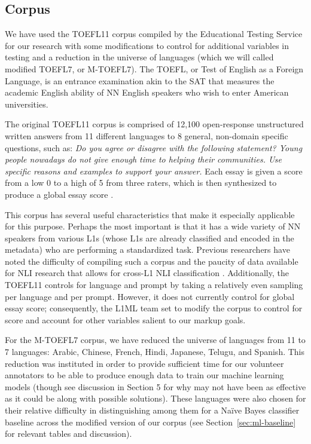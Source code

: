 \documentclass[10pt, a4paper]{article}
\begin{document}
\subsection{Corpus\label{sec:corpus}}
We have used the TOEFL11 corpus compiled by the Educational Testing Service for our research with some modifications to control for additional variables in testing and a reduction in the universe of languages (which we will called modified TOEFL7, or M-TOEFL7). The TOEFL, or Test of English as a Foreign Language, is an entrance examination akin to the SAT that measures the academic English ability of NN English speakers who wish to enter American universities. 

The original TOEFL11 corpus is comprised of 12,100 open-response unstructured written answers from 11 different languages to 8 general, non-domain specific questions, such as: \textit{Do you agree or disagree with the following statement? Young people nowadays do not give enough time to helping their communities. Use specific reasons and examples to support your answer.} Each essay is given a score from a low 0 to a high of 5 from three raters, which is then synthesized to produce a global essay score \cite{toefl11-report}. 

This corpus has several useful characteristics that make it especially applicable for this purpose. Perhaps the most important is that it has a wide variety of NN speakers from various L1s (whose L1s are already classified and encoded in the metadata) who are performing a standardized task. Previous researchers have noted the difficulty of compiling such a corpus and the paucity of data available for NLI research that allows for cross-L1 NLI classification \cite{toefl11-report}. Additionally, the TOEFL11 controls for language and prompt by taking a relatively even sampling per language and per prompt. However, it does not currently control for global essay score; consequently, the L1ML team set to modify the corpus to control for score and account for other variables salient to our markup goals. 

For the M-TOEFL7 corpus, we have reduced the universe of languages from 11 to 7 languages: Arabic, Chinese, French, Hindi, Japanese, Telugu, and Spanish. This reduction was instituted in order to provide sufficient time for our volunteer annotators to be able to produce enough data to train our machine learning models (though see discussion in Section 5 for why may not have been as effective as it could be along with possible solutions). These languages were also chosen for their relative difficulty in distinguishing among them for a Na\"ive Bayes classifier baseline across the modified version of our corpus (see Section~\ref{sec:ml-baseline} for relevant tables and discussion).
\end{document}
